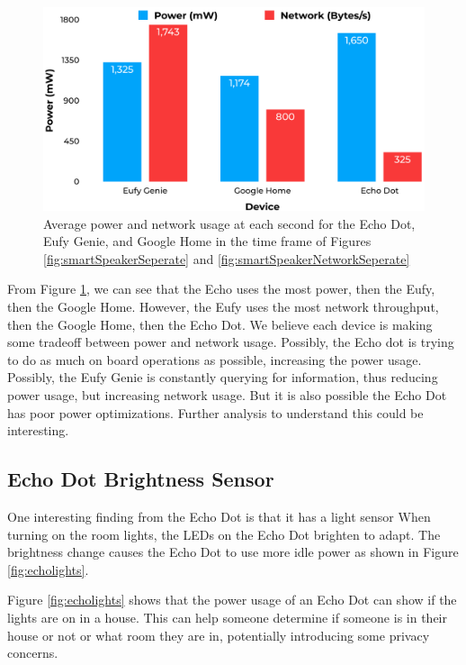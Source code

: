 \begin{figure}[H]
    \centering
    \includegraphics[width=1\textwidth]{figures/smartSpeakerComparison.png}
    \caption{Average power and network usage at each second for the Echo Dot, Eufy Genie, and Google Home in the time frame of Figures \ref{fig:smartSpeakerSeperate} and \ref{fig:smartSpeakerNetworkSeperate}}
    \label{fig:smartSpeakerComparison}
  \end{figure}

From Figure \ref{fig:smartSpeakerComparison}, we can see that the Echo uses the most power, then the Eufy, then the Google Home. However, the Eufy uses the most network throughput, then the Google Home, then the Echo Dot. We believe each device is making some tradeoff between power and network usage. Possibly, the Echo dot is trying to do as much on board operations as possible, increasing the power usage. Possibly, the Eufy Genie is constantly querying for information, thus reducing power usage, but increasing network usage. But it is also possible the Echo Dot has poor power optimizations. Further analysis to understand this could be interesting.

\subsection{Echo Dot Brightness Sensor}
\label{Echo Dot Brightness Sensor}
One interesting finding from the Echo Dot is that it has a light sensor When turning on the room lights, the LEDs on the Echo Dot brighten to adapt. The brightness change causes the Echo Dot to use more idle power as shown in Figure \ref{fig:echolights}.

Figure \ref{fig:echolights} shows that the power usage of an Echo Dot can show if the lights are on in a house. This can help someone determine if someone is in their house or not or what room they are in, potentially introducing some privacy concerns.

